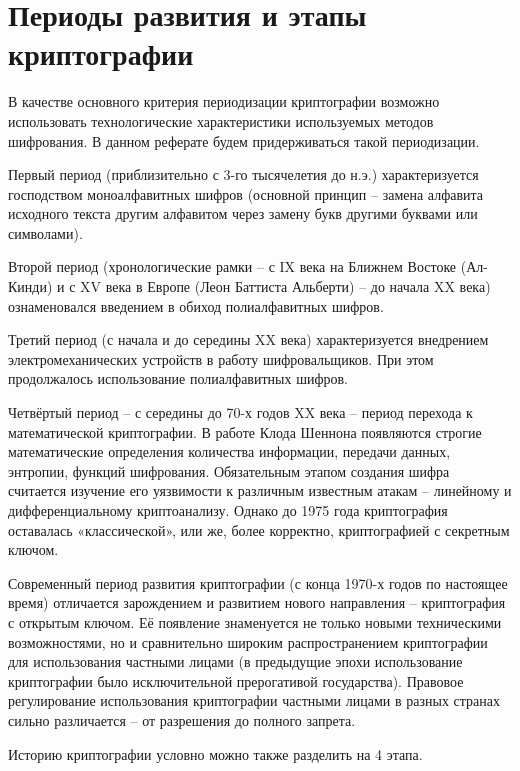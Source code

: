 
\clearpage

\section{Периоды развития и этапы криптографии}
В качестве основного критерия периодизации криптографии возможно использовать технологические характеристики используемых методов шифрования. В данном реферате будем придерживаться такой периодизации.

Первый период (приблизительно с 3-го тысячелетия до н.э.) характеризуется господством моноалфавитных шифров (основной принцип – замена алфавита исходного текста другим алфавитом через замену букв другими буквами или символами).

Второй период (хронологические рамки – с IX века на Ближнем Востоке (Ал-Кинди) и с XV века в Европе (Леон Баттиста Альберти) – до начала XX века) ознаменовался введением в обиход полиалфавитных шифров.

Третий период (с начала и до середины XX века) характеризуется внедрением электромеханических устройств в работу шифровальщиков. При этом продолжалось использование полиалфавитных шифров.

Четвёртый период – с середины до 70-х годов XX века – период перехода к математической криптографии. В работе Клода Шеннона появляются строгие математические определения количества информации, передачи данных, энтропии, функций шифрования. Обязательным этапом создания шифра считается изучение его уязвимости к различным известным атакам – линейному и дифференциальному криптоанализу. Однако до 1975 года криптография оставалась «классической», или же, более корректно, криптографией с секретным ключом.

Современный период развития криптографии (с конца 1970-х годов по настоящее время) отличается зарождением и развитием нового направления – криптография с открытым ключом. Её появление знаменуется не только новыми техническими возможностями, но и сравнительно широким распространением криптографии для использования частными лицами (в предыдущие эпохи использование криптографии было исключительной прерогативой государства). Правовое регулирование использования криптографии частными лицами в разных странах сильно различается – от разрешения до полного запрета.

Историю криптографии условно можно также разделить на 4 этапа\cite{scarani2004quantum}.

